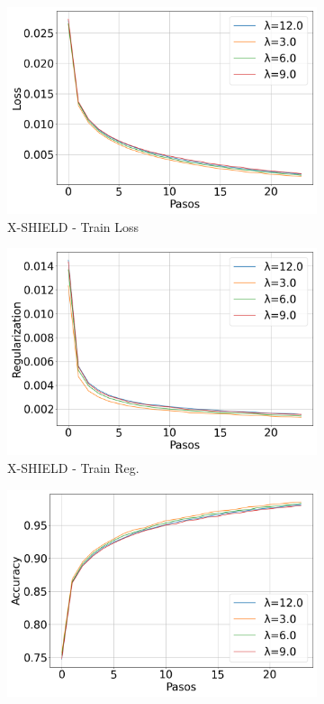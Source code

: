 \begin{figure}[H]
    \centering
    \begin{subfigure}[b]{0.3\textwidth}
        \includegraphics[width=\linewidth]{images/Train_Loss_evolucion_xshield.png}
        \caption{X-SHIELD - Train Loss}
    \end{subfigure}
    \hfill
    \begin{subfigure}[b]{0.3\textwidth}
        \includegraphics[width=\linewidth]{images/Train_Regularization_evolucion_xshield.png}
        \caption{X-SHIELD - Train Reg.}
    \end{subfigure}
    \hfill
    \begin{subfigure}[b]{0.3\textwidth}
        \includegraphics[width=\linewidth]{images/Train_Accuracy_evolucion_xshield.png}

\end{subfigure}
\end{figure}
